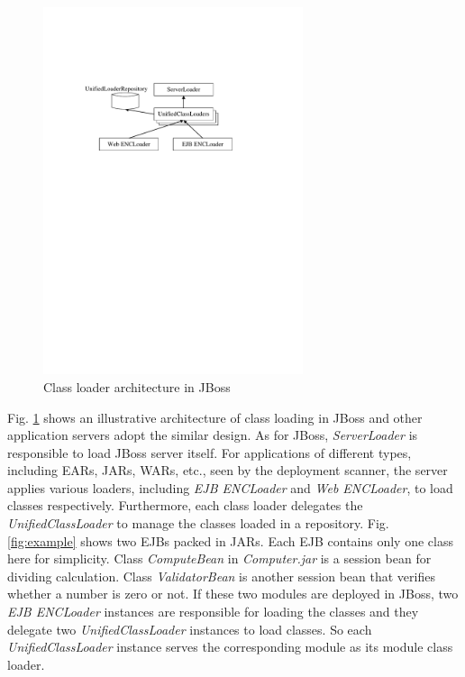 \documentclass[conference]{IEEEtran}
\begin{document}
\begin{figure}[ht]
\centering
\includegraphics[width=3.0in]{JBossClassLoader.pdf}
\caption{Class loader architecture in JBoss}
\label{fig:jboss_class_loader}
\end{figure}

Fig. \ref{fig:jboss_class_loader} shows an illustrative architecture of class loading in JBoss and other application servers adopt the similar design. As for JBoss, \emph{ServerLoader} is responsible to load JBoss server itself. For applications of different types, including EARs, JARs, WARs, etc., seen by the deployment scanner, the server applies various loaders, including \emph{EJB ENCLoader} and \emph{Web ENCLoader}, to load classes respectively. Furthermore, each class loader delegates the \emph{UnifiedClassLoader} to manage the classes loaded in a repository\cite{jboss_class_loader}. Fig. \ref{fig:example} shows two EJBs\cite{EJB} packed in JARs. Each EJB contains only one class here for simplicity. Class \emph{ComputeBean} in \emph{Computer.jar} is a session bean for dividing calculation. Class \emph{ValidatorBean} is another session bean that verifies whether a number is zero or not. If these two modules are deployed in JBoss, two \emph{EJB ENCLoader} instances are responsible for loading the classes and they delegate two \emph{UnifiedClassLoader} instances to load classes. So each \emph{UnifiedClassLoader} instance serves the corresponding module as its module class loader.
\end{document}
